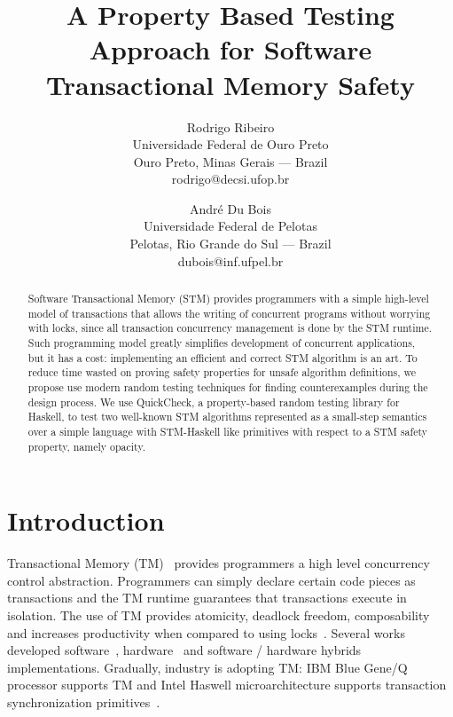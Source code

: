\documentclass{fundam}
\begin{document}
\title{A Property Based Testing Approach for Software Transactional Memory Safety}

\author{Rodrigo Ribeiro \\
Universidade Federal de Ouro Preto \\
Ouro Preto, Minas Gerais --- Brazil\\
rodrigo{@}decsi.ufop.br
\and
Andr\'e Du Bois\\
Universidade Federal de Pelotas\\
Pelotas, Rio Grande do Sul --- Brazil\\
dubois{@}inf.ufpel.br}

\maketitle

\begin{abstract}
Software Transactional Memory (STM) provides programmers with a simple high-level model of transactions that allows the
writing of concurrent programs without worrying with locks, since all transaction concurrency management is done by
the STM runtime. Such programming model greatly simplifies development of concurrent applications, but it has a cost:
implementing an efficient and correct STM algorithm is an art. To reduce time wasted on proving safety properties for
unsafe algorithm definitions, we propose use modern random testing techniques for finding counterexamples during
the design process. We use QuickCheck, a property-based random testing library for Haskell, to test
two well-known STM algorithms represented as a small-step semantics over a simple language with STM-Haskell like primitives
with respect to a STM safety property, namely opacity.
\end{abstract}





\section{Introduction}

Transactional Memory (TM)~\cite{Herlihy1993,Shavit1995} provides programmers a high level concurrency
control abstraction. Programmers can simply declare certain code pieces as
transactions and the TM runtime guarantees that transactions execute in isolation.
The use of TM provides atomicity, deadlock freedom, composability~\cite{Harris05} and
increases productivity when compared to using locks~\cite{Pankratius2011}. Several works developed
software~\cite{Herlihy2003,Herlihy2006,Dice06}, hardware~\cite{Hammond2004} and software / hardware hybrids~\cite{Baugh2008,Dalessandro2011}
implementations. Gradually, industry is adopting TM: IBM Blue Gene/Q processor supports TM and Intel Haswell microarchitecture
supports transaction synchronization primitives~\cite{TSX,Haring2012}.
\end{document}
